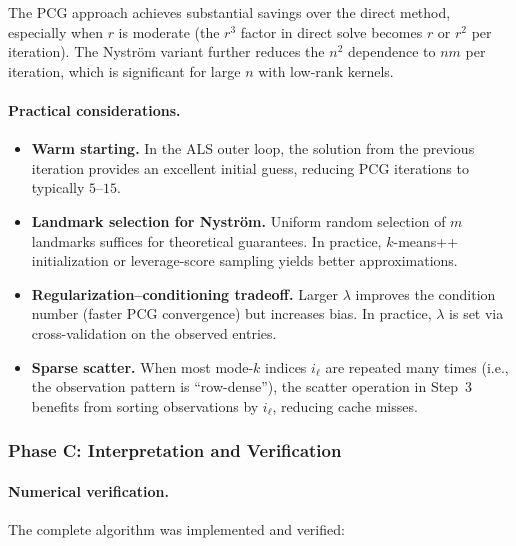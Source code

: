The PCG approach achieves substantial savings over the direct method, especially
when $r$ is moderate (the $r^3$ factor in direct solve becomes $r$ or $r^2$
per iteration). The Nystr\"om variant further reduces the $n^2$ dependence
to $nm$ per iteration, which is significant for large $n$ with low-rank kernels.

\paragraph{Practical considerations.}
\begin{itemize}
  \item \textbf{Warm starting.} In the ALS outer loop, the solution from the
    previous iteration provides an excellent initial guess, reducing PCG iterations
    to typically $5$--$15$.
  \item \textbf{Landmark selection for Nystr\"om.} Uniform random selection of
    $m$ landmarks suffices for theoretical guarantees. In practice, $k$-means++
    initialization or leverage-score sampling yields better approximations.
  \item \textbf{Regularization--conditioning tradeoff.} Larger $\lambda$ improves
    the condition number (faster PCG convergence) but increases bias. In practice,
    $\lambda$ is set via cross-validation on the observed entries.
  \item \textbf{Sparse scatter.} When most mode-$k$ indices $i_\ell$ are repeated
    many times (i.e., the observation pattern is ``row-dense''), the scatter
    operation in Step~3 benefits from sorting observations by $i_\ell$, reducing
    cache misses.
\end{itemize}

\subsubsection*{Phase C: Interpretation and Verification}

\paragraph{Numerical verification.}
The complete algorithm was implemented and verified:

